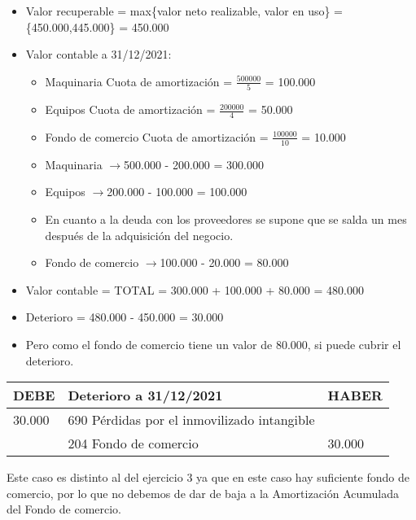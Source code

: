 \documentclass[a4paper,12pt]{article}
\newcommand{\fec}{31/12/}
\newcommand{\valorrecuperable}{Valor recuperable = max\{valor neto realizable, valor en uso\} =}
\newcommand{\VC}{Valor contable = }
\newcommand{\cuotaamort}{Cuota de amortización = }
\newcommand{\myequation}[2]{\ensuremath{\frac{#1}{#2}}}
\newcommand{\flechita}{$\rightarrow$}
\begin{document}
\begin{itemize}
    \item \valorrecuperable \{450.000,445.000\} = 450.000
    \item Valor contable a \fec2021:
    \begin{itemize}
        \item Maquinaria \cuotaamort \myequation{500000}{5} = 100.000
        \item Equipos \cuotaamort \myequation{200000}{4} = 50.000
        \item Fondo de comercio \cuotaamort \myequation{100000}{10} = 10.000
        \item Maquinaria \flechita 500.000 - 200.000  = 300.000
        \item Equipos \flechita 200.000 - 100.000 = 100.000
        \item En cuanto a la deuda con los proveedores se supone que se salda un mes después de la adquisición del negocio.
        \item Fondo de comercio \flechita 100.000 - 20.000 = 80.000
    \end{itemize}
    \item \VC TOTAL = 300.000 + 100.000 + 80.000 = 480.000
    \item Deterioro = 480.000 - 450.000 = 30.000
    \item Pero como el fondo de comercio tiene un valor de 80.000, si puede cubrir el deterioro.
\end{itemize}
\begin{table}[H]
    \centering
    \begin{tabular}{|p{3cm}|p{6cm}|p{3cm}|}
    \hline
    \textbf{DEBE} & \textbf{Deterioro a \fec2021} & \textbf{HABER} \\
    \hline
    30.000& 690 Pérdidas por el inmovilizado intangible& \\
    \hline
    & 204 Fondo de comercio& 30.000\\
    \hline
    \end{tabular}
\end{table}

\begin{tcolorbox}[colback=red!5!white,colframe=yellow!75!black!,title=IMPORTANTE]
    Este caso es distinto al del ejercicio 3 ya que en este caso hay suficiente fondo de comercio, por lo que no debemos de dar de baja a la Amortización Acumulada del Fondo de comercio.
\end{tcolorbox}
\end{document}
